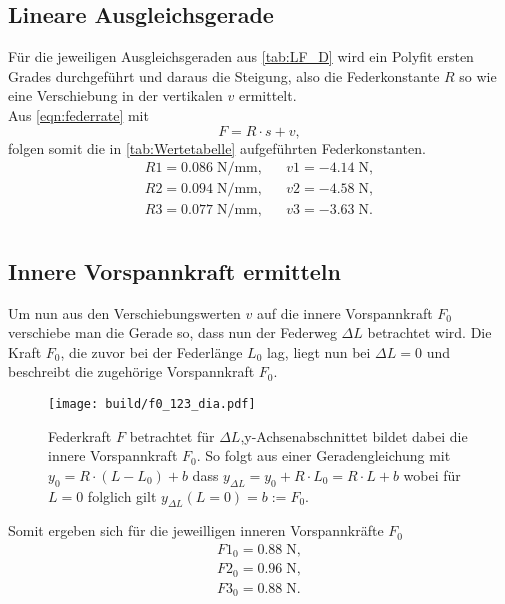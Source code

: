 \subsection{Lineare Ausgleichsgerade}
\label{sec:fit}
Für die jeweiligen Ausgleichsgeraden aus \ref{tab:LF_D} wird ein Polyfit \cite{numpy_polyfit}
ersten Grades durchgeführt und daraus die Steigung, also die Federkonstante $R$ so wie eine Verschiebung
in der vertikalen $v$ ermittelt.\\
Aus \ref{eqn:federrate} mit
\begin{equation}
  F=R \cdot s + v ,
\end{equation}
folgen somit die in \ref{tab:Wertetabelle} aufgeführten Federkonstanten.
\begin{align*}
  R1= 0.086\;\si{\N\per\mm}, &&  v1= -4.14\;\si{\N},\\
  R2= 0.094\;\si{\N\per\mm}, &&  v2= -4.58\;\si{\N},\\
  R3= 0.077\;\si{\N\per\mm}, &&  v3= -3.63\;\si{\N}.\\
\end{align*}

\subsection{Innere Vorspannkraft ermitteln}
\label{sec:vorspannkraft}
Um nun aus den Verschiebungswerten $v$ auf die innere Vorspannkraft $F_0$ verschiebe
man die Gerade so, dass nun der Federweg $\Delta L$ betrachtet wird.
Die Kraft $F_0$, die zuvor bei der Federlänge $L_0$ lag, liegt nun bei $\Delta L=0$
und beschreibt die zugehörige Vorspannkraft $F_0$.
\begin{figure}[H]
  \center
  \texttt{[image: build/f0\_123\_dia.pdf]}
  \caption
  {
    Federkraft $F$ betrachtet für $\Delta L$,y-Achsenabschnittet bildet dabei die innere Vorspannkraft $F_0$.
    So folgt aus einer Geradengleichung mit $y_0=R\cdot(L-L_0)+b$ dass $y_{\Delta L}=y_0+R \cdot L_0=R \cdot L+b$
    wobei für $L=0$ folglich gilt $y_{\Delta L}(L=0)=b:=F_0$.
  }
\end{figure}
Somit ergeben sich für die jeweilligen inneren Vorspannkräfte $F_0$
\begin{align*}
  F1_0=  0.88 \;\si{\N},\\
  F2_0=  0.96 \;\si{\N},\\
  F3_0=  0.88 \;\si{\N}.\\
\end{align*}



